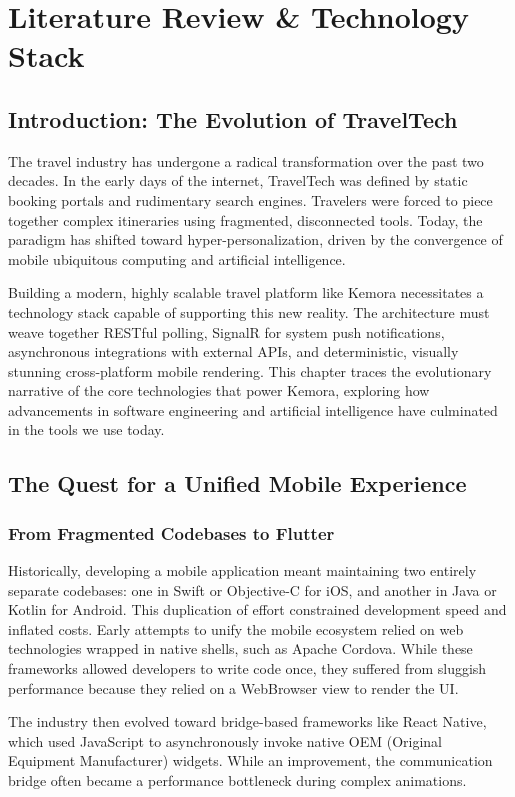 \chapter{Literature Review \& Technology Stack}

\section{Introduction: The Evolution of TravelTech}
The travel industry has undergone a radical transformation over the past two decades. In the early days of the internet, TravelTech was defined by static booking portals and rudimentary search engines. Travelers were forced to piece together complex itineraries using fragmented, disconnected tools. Today, the paradigm has shifted toward hyper-personalization, driven by the convergence of mobile ubiquitous computing and artificial intelligence. 

Building a modern, highly scalable travel platform like Kemora necessitates a technology stack capable of supporting this new reality. The architecture must weave together RESTful polling, SignalR for system push notifications, asynchronous integrations with external APIs, and deterministic, visually stunning cross-platform mobile rendering. This chapter traces the evolutionary narrative of the core technologies that power Kemora, exploring how advancements in software engineering and artificial intelligence have culminated in the tools we use today.

\section{The Quest for a Unified Mobile Experience}
\subsection{From Fragmented Codebases to Flutter}
Historically, developing a mobile application meant maintaining two entirely separate codebases: one in Swift or Objective-C for iOS, and another in Java or Kotlin for Android. This duplication of effort constrained development speed and inflated costs. Early attempts to unify the mobile ecosystem relied on web technologies wrapped in native shells, such as Apache Cordova. While these frameworks allowed developers to write code once, they suffered from sluggish performance because they relied on a WebBrowser view to render the UI.

The industry then evolved toward bridge-based frameworks like React Native, which used JavaScript to asynchronously invoke native OEM (Original Equipment Manufacturer) widgets. While an improvement, the communication bridge often became a performance bottleneck during complex animations. 


